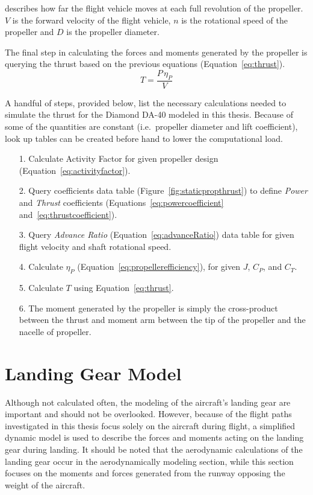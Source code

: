describes how far the flight vehicle moves at each full revolution of the propeller.
\(V\) is the forward velocity of the flight vehicle, \(n\) is the rotational speed of the propeller and \(D\) is the propeller diameter.

The final step in calculating the forces and moments generated by the propeller is querying the thrust based on the previous equations (Equation~\ref{eq:thrust}).
\begin{equation}\label{eq:thrust}
    T = \frac{P \, \eta_P}{V}
\end{equation}

A handful of steps, provided below, list the necessary calculations needed to simulate the thrust for the Diamond DA-40 modeled in this thesis. Because of some of the quantities are constant (i.e.\ propeller diameter and lift coefficient), look up tables can be created before hand to lower the computational load.

\begin{itemize}
    \item[1.] Calculate Activity Factor for given propeller design (Equation~\ref{eq:activityfactor}).
    \item[2.] Query coefficients data table (Figure~\ref{fig:staticpropthrust}) to define \textit{Power} and \textit{Thrust} coefficients (Equations~\ref{eq:powercoefficient} and~\ref{eq:thrustcoefficient}).
    \item[3.] Query \textit{Advance Ratio} (Equation~\ref{eq:advanceRatio}) data table for given flight velocity and shaft rotational speed.
    \item[4.] Calculate \( \eta_P \) (Equation~\ref{eq:propellerefficiency}), for given \(J\), \(C_P\), and \(C_T\).
    \item[5.] Calculate \(T\) using Equation~\ref{eq:thrust}.
    \item[6.] The moment generated by the propeller is simply the cross-product between the thrust and moment arm between the tip of the propeller and the nacelle of propeller.
\end{itemize}

\section{Landing Gear Model}
Although not calculated often, the modeling of the aircraft's landing gear are important and should not be overlooked. However, because of the flight paths investigated in this thesis focus solely on the aircraft during flight, a simplified dynamic model is used to describe the forces and moments acting on the landing gear during landing. It should be noted that the aerodynamic calculations of the landing gear occur in the aerodynamically modeling section, while this section focuses on the moments and forces generated from the runway opposing the weight of the aircraft.


